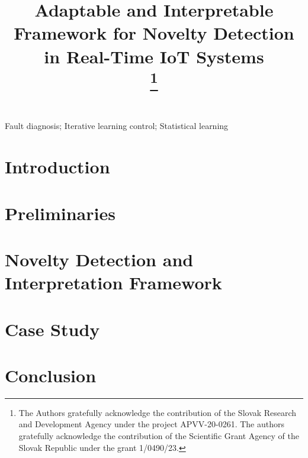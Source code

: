 \documentclass[conference]{IEEEtran}
\begin{document}
\title{\vspace{0.25in}Adaptable and Interpretable Framework for Novelty Detection in Real-Time IoT Systems\\
\thanks{The Authors gratefully acknowledge the contribution of the Slovak Research and Development Agency under the project APVV-20-0261. The authors gratefully acknowledge the contribution of the Scientific Grant Agency of the Slovak Republic under the grant 1/0490/23.}
}

\author{
}

\maketitle

\begin{abstract}

\end{abstract}

\begin{IEEEkeywords}
Fault diagnosis; Iterative learning control; Statistical learning
\end{IEEEkeywords}

\section{Introduction}\label{Introduction}


\section{Preliminaries}


\section{Novelty Detection and Interpretation Framework}


\section{Case Study}


\section{Conclusion}




\end{document}
